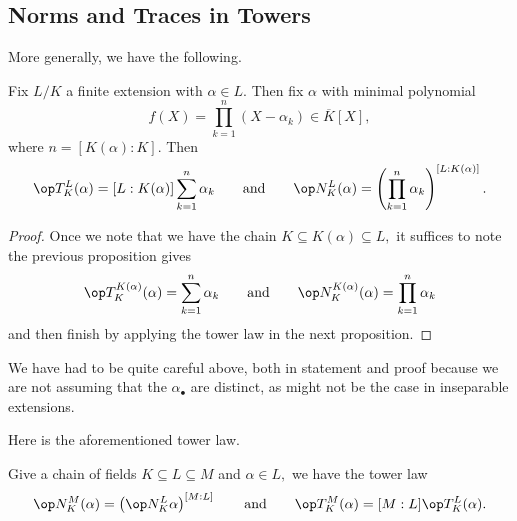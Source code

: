 \documentclass[../notes.tex]{subfiles}
\begin{document}
\subsection{Norms and Traces in Towers}
More generally, we have the following.
\begin{proposition} \label{prop:computenormtrace}
	Fix $L/K$ a finite extension with $\alpha\in L.$ Then fix $\alpha$ with minimal polynomial
	\[f(X)=\prod_{k=1}^n(X-\alpha_k)\in\overline K[X],\]
	where $n=[K(\alpha):K].$ Then
	\[\op T^L_K(\alpha)=[L:K(\alpha)]\sum_{k=1}^n\alpha_k\qquad\text{and}\qquad\op N^L_K(\alpha)=\left(\prod_{k=1}^n\alpha_k\right)^{[L:K(\alpha)]}.\]
\end{proposition}
\begin{proof}
	Once we note that we have the chain $K\subseteq K(\alpha)\subseteq L,$ it suffices to note the previous proposition gives
	\[\op T^{K(\alpha)}_K(\alpha)=\sum_{k=1}^n\alpha_k\qquad\text{and}\qquad\op N^{K(\alpha)}_K(\alpha)=\prod_{k=1}^n\alpha_k\]
	and then finish by applying the tower law in the next proposition.
\end{proof}
\begin{remark}[Nir]
	We have had to be quite careful above, both in statement and proof because we are not assuming that the $\alpha_\bullet$ are distinct, as might not be the case in inseparable extensions.
\end{remark}
Here is the aforementioned tower law.
\begin{proposition} \label{prop:babytowerlaw}
	Give a chain of fields $K\subseteq L\subseteq M$ and $\alpha\in L,$ we have the tower law
	\[\op N^M_K(\alpha)=\left(\op N^L_K\alpha\right)^{[M:L]}\qquad\text{and}\qquad\op T^M_K(\alpha)=[M:L]\op T^L_K(\alpha).\]
\end{proposition}
\end{document}
